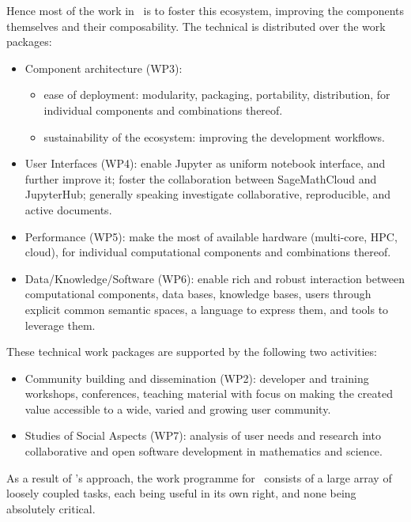 \documentclass{deliverablereport}
\begin{document}
Hence most of the work in \ODK\ is to foster this ecosystem, improving
the components themselves and their composability. The technical is
distributed over the work packages:
\begin{itemize}
\item Component architecture (WP3):
  \begin{itemize}
  \item ease of deployment: modularity, packaging, portability,
    distribution, for individual components and combinations thereof.
  \item sustainability of the ecosystem: improving the development workflows.
  \end{itemize}
\item User Interfaces (WP4): enable Jupyter as uniform notebook
  interface, and further improve it; foster the collaboration between
  SageMathCloud and JupyterHub; generally speaking investigate
  collaborative, reproducible, and active documents.
\item Performance (WP5): make the most of available hardware
  (multi-core, HPC, cloud), for individual computational components and
  combinations thereof.
\item Data/Knowledge/Software (WP6): enable rich and robust
  interaction between computational components, data bases, knowledge
  bases, users through explicit common semantic spaces, a language to
  express them, and tools to leverage them.
\end{itemize}
These technical work packages are supported by the following two activities:
\begin{itemize}
\item Community building and dissemination (WP2): developer and
  training workshops, conferences, teaching material with focus on
  making the created value accessible to a wide, varied and growing user community.
\item Studies of Social Aspects (WP7): analysis of user needs and
  research into collaborative and open software development in
  mathematics and science.
\end{itemize}

As a result of \ODK's approach, the work programme for \ODK\ consists
of a large array of loosely coupled tasks, each being useful in its
own right, and none being absolutely critical.
\end{document}

